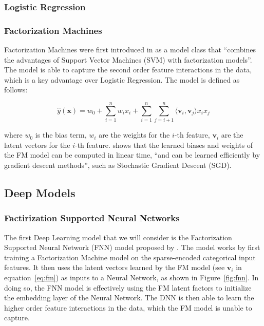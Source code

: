 \documentclass{mldsmsc}
\begin{document}
\subsubsection{Logistic Regression}


\subsubsection{Factorization Machines}

Factorization Machines were first introduced in \citep{RefWorks:rendle2010factorization} as
a model class that ``combines the advantages of Support Vector Machines (SVM) with factorization models''.
The model is able to capture the second order feature interactions in the data, which is a key advantage over
Logistic Regression. The model is defined as follows:

\begin{equation}
\label{eq:fm}
\hat{y}(\mathbf{x}) = w_0 + \sum_{i=1}^{n} w_i x_i + \sum_{i=1}^{n} \sum_{j=i+1}^{n} \langle \mathbf{v}_i, \mathbf{v}_j \rangle x_i x_j
\end{equation}

where $w_0$ is the bias term, $w_i$ are the weights for the $i$-th feature, $\mathbf{v}_i$ are the latent vectors for the $i$-th feature.
\cite{RefWorks:rendle2010factorization} shows that the learned biases and weights of the FM model can be
computed in linear time, ``and can be learned efficiently by gradient descent methods'', such as Stochastic Gradient Descent (SGD).


\subsection{Deep Models}

\subsubsection{Factirization Supported Neural Networks}

The first Deep Learning model that we will consider is the Factorization Supported
Neural Network (FNN) model proposed by \cite{RefWorks:zhang2016deep}. The model works by first training a Factorization Machine
model on the sparse-encoded categorical input features. It then uses the latent vectors learned by the FM model (see $\mathbf{v}_i$ in equation~\ref{eq:fm})
as inputs to a Neural Network, as shown in Figure~\ref{fig:fnn}. In doing so, the FNN model is effectively using the FM latent factors to initialize the embedding layer of the Neural Network.
The DNN is then able to learn the higher order feature interactions in the data, which the FM model is unable to capture.
\end{document}
